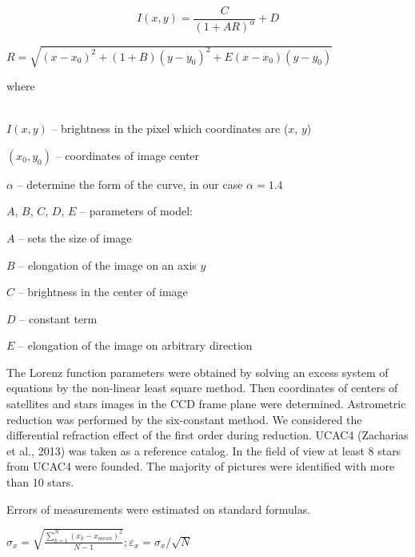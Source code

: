 \documentclass[]{article}
\begin{document}
\begin{equation}
\label{1}
I(x,y) = \frac{C}{(1 + AR)^{\alpha}} + D
\end{equation}
\begin{center}
\begin{math}
R = \sqrt{(x-x_0)^2 + (1+B)(y-y_0)^2 +E(x-x_0)(y-y_0)}
\end{math}\\
\end{center}
where\par
\\
$I(x,y)$ -- brightness in the pixel which coordinates are ($x$, $y$)\par
$(x_0, y_0)$ -- coordinates of image center\par
$\alpha$ --  determine the form of the curve, in our case $\alpha = 1.4$\par
$A$, $B$, $C$, $D$, $E$ -- parameters of model:\par
$A$ -- sets the size of image\par
$B$ -- elongation of the image on an axis $y$\par
$C$ -- brightness in the center of image\par
$D$ -- constant term\par
$E$ -- elongation of the image on arbitrary direction\par
\vskip0.1cm

The Lorenz function parameters were obtained by solving an excess system of equations by the non-linear least square method. Then coordinates of centers of satellites and stars images in the CCD frame plane were determined. Astrometric reduction was performed by the six-constant method. We considered the differential refraction effect of the first order during reduction. UCAC4 (Zacharias et al., 2013) was taken as a reference catalog. In the field of view at least 8 stars from UCAC4 were founded. The majority of pictures were identified with more than 10 stars. \par
Errors of measurements were estimated on standard formulas.

\begin{math}
\sigma_x = \sqrt{\frac{\sum\limits_{k=1}^{N}(x_k-x_{mean})^2}{N-1}}; \varepsilon_x = \sigma_x/\sqrt{N}
\end{math}\\
\end{document}
